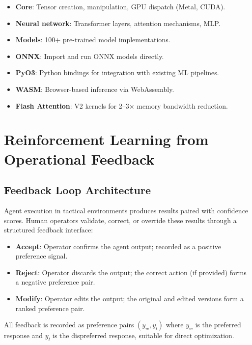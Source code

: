 \documentclass[11pt,letterpaper]{article}
\begin{document}
\begin{itemize}
\item \textbf{Core}: Tensor creation, manipulation, GPU dispatch (Metal, CUDA).
\item \textbf{Neural network}: Transformer layers, attention mechanisms, MLP.
\item \textbf{Models}: 100+ pre-trained model implementations.
\item \textbf{ONNX}: Import and run ONNX models directly.
\item \textbf{PyO3}: Python bindings for integration with existing ML pipelines.
\item \textbf{WASM}: Browser-based inference via WebAssembly.
\item \textbf{Flash Attention}: V2 kernels for 2--3$\times$ memory bandwidth reduction.
\end{itemize}

\section{Reinforcement Learning from Operational Feedback}

\subsection{Feedback Loop Architecture}

Agent execution in tactical environments produces results paired with confidence scores. Human operators validate, correct, or override these results through a structured feedback interface:

\begin{itemize}
\item \textbf{Accept}: Operator confirms the agent output; recorded as a positive preference signal.
\item \textbf{Reject}: Operator discards the output; the correct action (if provided) forms a negative preference pair.
\item \textbf{Modify}: Operator edits the output; the original and edited versions form a ranked preference pair.
\end{itemize}

All feedback is recorded as preference pairs $(y_w, y_l)$ where $y_w$ is the preferred response and $y_l$ is the dispreferred response, suitable for direct optimization.
\end{document}
